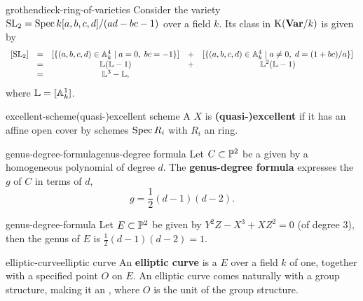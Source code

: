 \begin{example}{grothendieck-ring-of-varieties}
    Consider the variety $\textup{SL}_2 = \Spec k[a, b, c, d] / (ad - bc - 1)$ over a field $k$. Its class in $\textup{K}(\textbf{Var}/k)$ is given by
    \[ \begin{array}{ccccc}
        [\textup{SL}_2] & = & [\{ (a, b, c, d) \in \AA^4_k \mid a = 0, \; bc = -1 \}] & + & [\{ (a, b, c, d) \in \AA^4_k \mid a \ne 0, \; d = (1 + bc) / a \}] \\
            & = & \mathbb{L} (\mathbb{L} - 1) & + & \mathbb{L}^2 (\mathbb{L} - 1) \\
            & = & \mathbb{L}^3 - \mathbb{L} , &
    \end{array} \]
    where $\mathbb{L} = [\AA^1_k]$.
\end{example}

\begin{topic}{excellent-scheme}{(quasi-)excellent scheme}
    A  $X$ is \textbf{(quasi-)excellent} if it has an affine open cover by schemes $\Spec R_i$ with $R_i$ an  ring.
\end{topic}

\begin{topic}{genus-degree-formula}{genus-degree formula}
    Let $C \subset \PP^2$ be a    given by a homogeneous polynomial of degree $d$. The \textbf{genus-degree formula} expresses the  $g$ of $C$ in terms of $d$,
    \[ g = \frac{1}{2}(d - 1)(d - 2) . \]
\end{topic}

\begin{example}{genus-degree-formula}
    Let $E \subset \PP^2$ be given by $Y^2Z - X^3 + XZ^2 = 0$ (of degree $3$), then the genus of $E$ is $\frac{1}{2}(d - 1)(d - 2) = 1$.
\end{example}

\begin{topic}{elliptic-curve}{elliptic curve}
    An \textbf{elliptic curve} is a    $E$ over a field $k$ of  one, together with a specified point $O$ on $E$. An elliptic curve comes naturally with a group structure, making it an , where $O$ is the unit of the group structure.
\end{topic}

